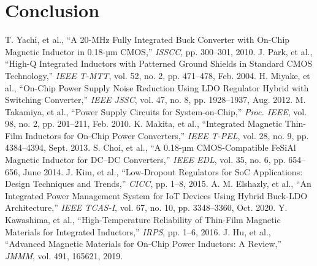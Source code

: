 \documentclass[conference]{IEEEtran}
\begin{document}
\section{Conclusion}


\begin{thebibliography}{10}
 T. Yachi, et al., ``A 20-MHz Fully Integrated Buck Converter with On-Chip Magnetic Inductor in 0.18-µm CMOS,'' \textit{ISSCC}, pp. 300--301, 2010.
 J. Park, et al., ``High-Q Integrated Inductors with Patterned Ground Shields in Standard CMOS Technology,'' \textit{IEEE T-MTT}, vol. 52, no. 2, pp. 471--478, Feb. 2004.
 H. Miyake, et al., ``On-Chip Power Supply Noise Reduction Using LDO Regulator Hybrid with Switching Converter,'' \textit{IEEE JSSC}, vol. 47, no. 8, pp. 1928--1937, Aug. 2012.
 M. Takamiya, et al., ``Power Supply Circuits for System-on-Chip,'' \textit{Proc. IEEE}, vol. 98, no. 2, pp. 201--211, Feb. 2010.
 K. Makita, et al., ``Integrated Magnetic Thin-Film Inductors for On-Chip Power Converters,'' \textit{IEEE T-PEL}, vol. 28, no. 9, pp. 4384--4394, Sept. 2013.
 S. Choi, et al., ``A 0.18-µm CMOS-Compatible FeSiAl Magnetic Inductor for DC--DC Converters,'' \textit{IEEE EDL}, vol. 35, no. 6, pp. 654--656, June 2014.
 J. Kim, et al., ``Low-Dropout Regulators for SoC Applications: Design Techniques and Trends,'' \textit{CICC}, pp. 1--8, 2015.
 A. M. Elshazly, et al., ``An Integrated Power Management System for IoT Devices Using Hybrid Buck-LDO Architecture,'' \textit{IEEE TCAS-I}, vol. 67, no. 10, pp. 3348--3360, Oct. 2020.
 Y. Kawashima, et al., ``High-Temperature Reliability of Thin-Film Magnetic Materials for Integrated Inductors,'' \textit{IRPS}, pp. 1--6, 2016.
 J. Hu, et al., ``Advanced Magnetic Materials for On-Chip Power Inductors: A Review,'' \textit{JMMM}, vol. 491, 165621, 2019.
\end{thebibliography}
\end{document}
